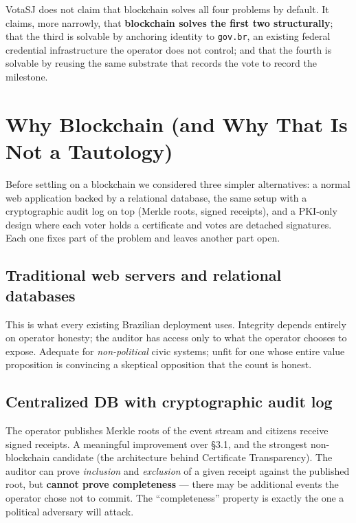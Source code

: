 \documentclass[12pt]{article}
\begin{document}
VotaSJ does not claim that blockchain solves all four problems by default.
It claims, more narrowly, that \textbf{blockchain solves the first two
structurally}; that the third is solvable by anchoring identity to
\texttt{gov.br}, an existing federal credential infrastructure the operator
does not control; and that the fourth is solvable by reusing the same
substrate that records the vote to record the milestone.

\section{Why Blockchain (and Why That Is Not a Tautology)}
\label{sec:why-bc}

Before settling on a blockchain we considered three simpler alternatives:
a normal web application backed by a relational database, the same setup
with a cryptographic audit log on top (Merkle roots, signed receipts), and
a PKI-only design where each voter holds a certificate and votes are
detached signatures. Each one fixes part of the problem and leaves another
part open.

\subsection{Traditional web servers and relational databases}

This is what every existing Brazilian deployment uses. Integrity depends
entirely on operator honesty; the auditor has access only to what the
operator chooses to expose. Adequate for \textit{non-political} civic
systems; unfit for one whose entire value proposition is convincing a
skeptical opposition that the count is honest.

\subsection{Centralized DB with cryptographic audit log}

The operator publishes Merkle roots of the event stream and citizens receive
signed receipts. A meaningful improvement over §3.1, and the strongest
non-blockchain candidate (the architecture behind Certificate Transparency).
The auditor can prove \textit{inclusion} and \textit{exclusion} of a given
receipt against the published root, but \textbf{cannot prove completeness}
--- there may be additional events the operator chose not to commit. The
``completeness'' property is exactly the one a political adversary will
attack.
\end{document}
